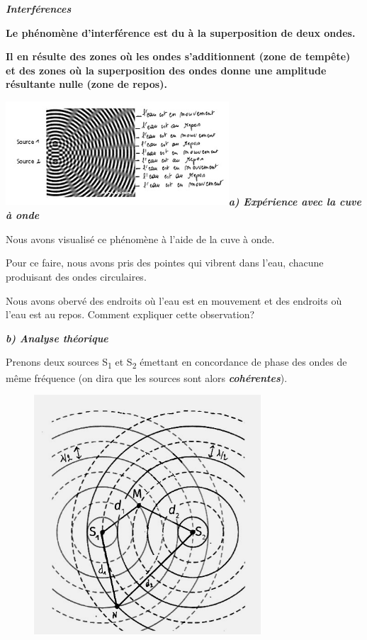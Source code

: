 \emph{\textbf{Interférences}}

\textbf{Le phénomène d'interférence est du à la superposition de deux
ondes.}

\textbf{Il en résulte des zones où les ondes s'additionnent (zone de
tempête) et des zones où la superposition des ondes donne une amplitude
résultante nulle (zone de repos).}

\includegraphics[width=8.326cm,height=3.881cm]{Pictures/10000001000001A4000000C3DDA5D7BD0B699726.png}\emph{\textbf{a)
Expérience avec la cuve à onde}}

Nous avons visualisé ce phénomène à l'aide de la cuve à onde.

Pour ce faire, nous avons pris des pointes qui vibrent dans l'eau,
chacune produisant des ondes circulaires.

Nous avons obervé des endroits où l'eau est en mouvement et des endroits
où l'eau est au repos. Comment expliquer cette observation?

\emph{\textbf{b) Analyse théorique}}

Prenons deux sources S\textsubscript{1} et S\textsubscript{2} émettant
en concordance de phase des ondes de même fréquence (on dira que les
sources sont alors \emph{\textbf{cohérentes}}).

\begin{figure}
\centering
\includegraphics[width=8.47cm,height=8.927cm]{Pictures/10000001000001DE000001F885F9EB969C92123B.png}
\caption{}
\end{figure}

